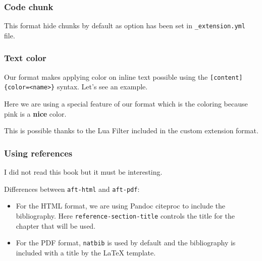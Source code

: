 \documentclass[manuscript,screen,review]{acmart}
\providecommand{\tightlist}{%
  \setlength{\itemsep}{0pt}\setlength{\parskip}{0pt}}\usepackage{longtable,booktabs,array}
\begin{document}
\subsubsection{Code chunk}\label{sec-chunks}

This format hide chunks by default as option has been set in
\texttt{\_extension.yml} file.

\subsubsection{Text color}\label{sec-summary}

Our format makes applying color on inline text possible using the
\texttt{{[}content{]}\{color=\textless{}name\textgreater{}\}} syntax.
Let's see an example.

Here we are using a special feature of our format which is the coloring
because \textcolor{mypink}{pink is a \textbf{nice} color}.

This is possible thanks to the Lua Filter included in the custom
extension format.

\subsubsection*{Using references}\label{using-references}

I did not read this book \citep{CameronTrivedi2013} but it must be
interesting.

Differences between \texttt{aft-html} and \texttt{aft-pdf}:

\begin{itemize}
\tightlist
\item
  For the HTML format, we are using Pandoc citeproc to include the
  bibliography. Here \texttt{reference-section-title} controls the title
  for the chapter that will be used.
\item
  For the PDF format, \texttt{natbib} is used by default and the
  bibliography is included with a title by the LaTeX template.
\end{itemize}

\end{document}

